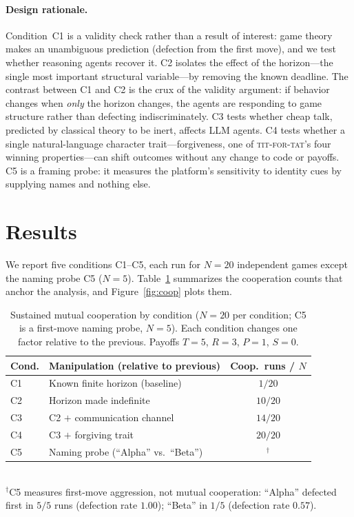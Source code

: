 \paragraph{Design rationale.}
Condition~C1 is a validity check rather than a result of interest: game theory makes an unambiguous prediction (defection from the first move), and we test whether reasoning agents recover it. C2 isolates the effect of the horizon---the single most important structural variable---by removing the known deadline. The contrast between C1 and C2 is the crux of the validity argument: if behavior changes when \emph{only} the horizon changes, the agents are responding to game structure rather than defecting indiscriminately. C3 tests whether cheap talk, predicted by classical theory to be inert, affects LLM agents. C4 tests whether a single natural-language character trait---forgiveness, one of \textsc{tit-for-tat}'s four winning properties---can shift outcomes without any change to code or payoffs. C5 is a framing probe: it measures the platform's sensitivity to identity cues by supplying names and nothing else.

\section{Results}
\label{sec:results}

We report five conditions C1--C5, each run for $N=20$ independent games except the naming probe C5 ($N=5$). Table~\ref{tab:coop} summarizes the cooperation counts that anchor the analysis, and Figure~\ref{fig:coop} plots them.

\begin{table}[t]
  \centering
  \caption{Sustained mutual cooperation by condition ($N=20$ per condition; C5 is a first-move naming probe, $N=5$). Each condition changes one factor relative to the previous. Payoffs $T{=}5$, $R{=}3$, $P{=}1$, $S{=}0$.}
  \label{tab:coop}
  \begin{tabular}{@{}llc@{}}
    \toprule
    Cond. & Manipulation (relative to previous) & Coop.\ runs / $N$ \\
    \midrule
    C1 & Known finite horizon (baseline)        & $1/20$  \\
    C2 & Horizon made indefinite                & $10/20$ \\
    C3 & C2 $+$ communication channel           & $14/20$ \\
    C4 & C3 $+$ forgiving trait                  & $20/20$ \\
    \midrule
    C5 & Naming probe (``Alpha'' vs.\ ``Beta'') & $^{\dagger}$ \\
    \bottomrule
  \end{tabular}
  \\[3pt]
  {\footnotesize $^{\dagger}$C5 measures first-move aggression, not mutual cooperation: ``Alpha'' defected first in $5/5$ runs (defection rate $1.00$); ``Beta'' in $1/5$ (defection rate $0.57$).}
\end{table}

